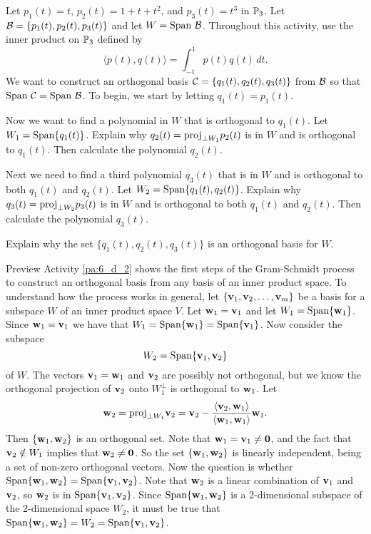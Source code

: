 \begin{pa} \label{pa:6_d_2}  Let $p_1(t) = t$, $p_2(t) = 1+t+t^2$, and $p_3(t) = t^3$ in $\mathbb{P}_3$. Let $\mathcal{B} = \{p_1(t), p_2(t), p_3(t)\}$ and let $W= \text{Span} \ \mathcal{B}$. Throughout this activity, use the inner product on $\mathbb{P}_3$ defined by 
\[\langle p(t), q(t) \rangle = \int_{-1}^1 p(t)q(t) \, dt.\]
We want to construct an orthogonal basis $\mathcal{C} = \{q_1(t), q_2(t), q_3(t)\}$ from $\mathcal{B}$ so that $\text{Span} \ \mathcal{C} = \text{Span} \ \mathcal{B}$. To begin, we start by letting $q_1(t) = p_1(t)$. 
	\be
	\item Now we want to find a polynomial in $W$ that is orthogonal to $q_1(t)$. Let $W_1 = \text{Span}\{q_1(t)\}$. Explain why $q_2(t) = \text{proj}_{\perp W_1} p_2(t)$ is in $W$ and is orthogonal to $q_1(t)$. Then calculate the polynomial $q_2(t)$.  


	\item Next we need to find a third polynomial $q_3(t)$ that is in $W$ and is orthogonal to both $q_1(t)$ and $q_2(t)$. Let $W_2 = \text{Span} \{q_1(t), q_2(t)\}$. Explain why $q_3(t) = \text{proj}_{\perp W_2} p_3(t)$ is in $W$ and is orthogonal to both $q_1(t)$ and $q_2(t)$. Then calculate the polynomial $q_3(t)$.  

	\item Explain why the set $\{q_1(t), q_2(t), q_3(t)\}$ is an orthogonal basis for $W$. 


	\ee
	
\end{pa}

Preview Activity \ref{pa:6_d_2} shows the first steps of the Gram-Schmidt process to construct an orthogonal basis from any basis of an inner product space.  To understand how the process works in general, let $\{\mathbf{v}_1, \mathbf{v}_2, \ldots, \mathbf{v}_m\}$ be a basis for a subspace $W$ of an inner product space $V$. Let $\mathbf{w}_1 = \mathbf{v}_1$ and let $W_1 = \text{Span}\{\mathbf{w}_1\}$. Since $\mathbf{w}_1 = \mathbf{v}_1$ we have that $W_1 = \text{Span}\{\mathbf{w}_1\} = \text{Span}\{\mathbf{v}_1\}$. Now consider the subspace 
\[W_2 = \text{Span}\{\mathbf{v}_1, \mathbf{v}_2\}\]
of $W$. The vectors $\mathbf{v}_1 = \mathbf{w}_1$ and $\mathbf{v}_2$ are possibly not orthogonal, but we know the orthogonal projection of $\mathbf{v}_2$ onto $W_1^{\perp}$ is orthogonal to $\mathbf{w}_1$. Let
\[\mathbf{w}_2 = \text{proj}_{\perp W_1} \mathbf{v}_2 = \mathbf{v}_2 -  \frac{\langle \mathbf{v}_2, \mathbf{w}_1 \rangle}{\langle \mathbf{w}_1, \mathbf{w}_1 \rangle} \mathbf{w}_1.\]
Then $\{\mathbf{w}_1, \mathbf{w}_2\}$ is an orthogonal set. Note that $\mathbf{w}_1 = \mathbf{v}_1 \neq \mathbf{0}$, and the fact that $\mathbf{v}_2 \notin W_1$ implies that $\mathbf{w}_2 \neq \mathbf{0}$. So the set $\{\mathbf{w}_1, \mathbf{w}_2\}$ is linearly independent, being a set of non-zero orthogonal vectors. Now the question is whether $\text{Span}\{\mathbf{w}_1,\mathbf{w}_2\} = \text{Span}\{\mathbf{v}_1,\mathbf{v}_2\}$. Note that $\mathbf{w}_2$ is a linear combination of $\mathbf{v}_1$ and $\mathbf{v}_2$, so $\mathbf{w}_2$ is in $\text{Span}\{\mathbf{v}_1,\mathbf{v}_2\}$. Since $\text{Span}\{\mathbf{w}_1,\mathbf{w}_2\}$ is a 2-dimensional subspace of the 2-dimensional space $W_2$, it must be true that $\text{Span}\{\mathbf{w}_1,\mathbf{w}_2\} = W_2 = \text{Span}\{\mathbf{v}_1,\mathbf{v}_2\}$.

